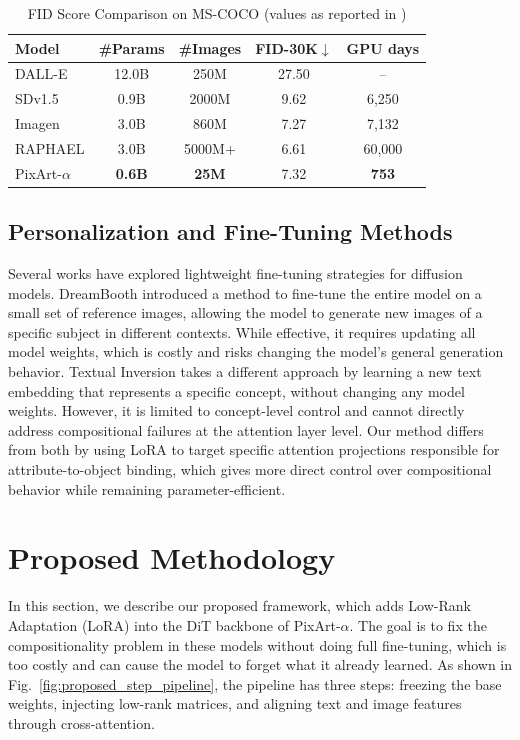 \documentclass[12pt,onecolumn]{IEEEtran}
\begin{document}
\begin{table}[h]
\centering
\caption{FID Score Comparison on MS-COCO (values as reported in \cite{chen2023pixartalpha})}
\label{tab:fid}
\begin{tabular}{lcccc}
\hline
\textbf{Model} & \textbf{\#Params} & \textbf{\#Images} & \textbf{FID-30K$\downarrow$} & \textbf{GPU days} \\
\hline
DALL-E & 12.0B & 250M & 27.50 & -- \\
SDv1.5 & 0.9B & 2000M & 9.62 & 6,250 \\
Imagen & 3.0B & 860M & 7.27 & 7,132 \\
RAPHAEL & 3.0B & 5000M+ & 6.61 & 60,000 \\
PixArt-$\alpha$ & \textbf{0.6B} & \textbf{25M} & 7.32 & \textbf{753} \\
\hline
\end{tabular}
\end{table}

\subsection{Personalization and Fine-Tuning Methods}
Several works have explored lightweight fine-tuning strategies for diffusion models. DreamBooth \cite{ruiz2023dreambooth} introduced a method to fine-tune the entire model on a small set of reference images, allowing the model to generate new images of a specific subject in different contexts. While effective, it requires updating all model weights, which is costly and risks changing the model's general generation behavior. Textual Inversion \cite{gal2022textual} takes a different approach by learning a new text embedding that represents a specific concept, without changing any model weights. However, it is limited to concept-level control and cannot directly address compositional failures at the attention layer level. Our method differs from both by using LoRA to target specific attention projections responsible for attribute-to-object binding, which gives more direct control over compositional behavior while remaining parameter-efficient.
\section{Proposed Methodology}\label{sec:method}

In this section, we describe our proposed framework, which adds Low-Rank Adaptation (LoRA) into the DiT backbone of PixArt-$\alpha$. The goal is to fix the compositionality problem in these models without doing full fine-tuning, which is too costly and can cause the model to forget what it already learned. As shown in Fig.~\ref{fig:proposed_step_pipeline}, the pipeline has three steps: freezing the base weights, injecting low-rank matrices, and aligning text and image features through cross-attention.
\end{document}
